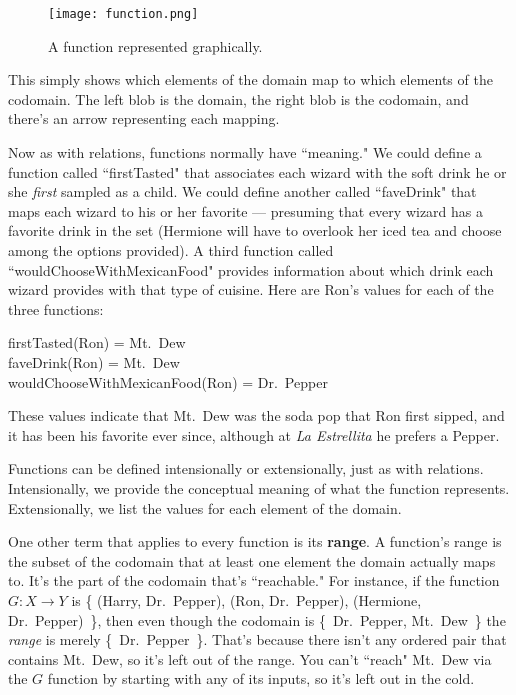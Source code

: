 \begin{figure}[ht]
\centering
\texttt{[image: function.png]}
\caption{A function represented graphically.}
\label{function}
\end{figure}

This simply shows which elements of the domain map to which elements of the
codomain. The left blob is the domain, the right blob is the codomain, and
there's an arrow representing each mapping.

Now as with relations, functions normally have ``meaning." We could define
a function called ``firstTasted" that associates each wizard with the soft
drink he or she \textit{first} sampled as a child. We could define another
called ``faveDrink" that maps each wizard to his or her favorite ---
presuming that every wizard has a favorite drink in the set (Hermione will
have to overlook her iced tea and choose among the options provided).  A
third function called ``wouldChooseWithMexicanFood" provides information
about which drink each wizard provides with that type of cuisine. Here are
Ron's values for each of the three functions:

\begin{center}
firstTasted(Ron) = Mt.~Dew \\
faveDrink(Ron) = Mt.~Dew \\
wouldChooseWithMexicanFood(Ron) = Dr.~Pepper
\end{center}

These values indicate that Mt.~Dew was the soda pop that Ron first sipped,
and it has been his favorite ever since, although at \textit{La Estrellita}
he prefers a Pepper.

Functions can be defined intensionally or extensionally, just as with
relations. Intensionally, we provide the conceptual meaning of what the
function represents. Extensionally, we list the values for each element of
the domain.

One other term that applies to every function is its \textbf{range}. A
function's range is the subset of the codomain that at least one element
the domain actually maps to. It's the part of the codomain that's
``reachable." For instance, if the function $G : X \rightarrow Y$ is \{
(Harry, Dr.~Pepper), (Ron, Dr.~Pepper), (Hermione, Dr.~Pepper)~\}, then
even though the codomain is \{~Dr.~Pepper, Mt.~Dew~\} the \textit{range} is
merely \{~Dr.~Pepper~\}.  That's because there isn't any ordered pair that
contains Mt.~Dew, so it's left out of the range. You can't ``reach" Mt.~Dew
via the $G$ function by starting with any of its inputs, so it's left out
in the cold.

